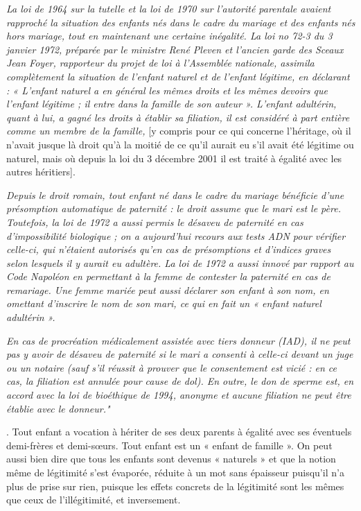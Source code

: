 {\emph{La loi de 1964 sur la tutelle et la loi de 1970 sur l'autorité parentale avaient rapproché la situation des enfants nés dans le cadre du mariage et des enfants nés hors mariage, tout en maintenant une certaine inégalité. La loi no 72-3 du 3 janvier 1972, préparée par le ministre René Pleven et l'ancien garde des Sceaux Jean Foyer, rapporteur du projet de loi à l'Assemblée nationale, assimila complètement la situation de l'enfant naturel et de l'enfant légitime, en déclarant : « L'enfant naturel a en général les mêmes droits et les mêmes devoirs que l'enfant légitime ; il entre dans la famille de son auteur ». L'enfant adultérin, quant à lui, a gagné les droits à établir sa filiation, il est considéré à part entière comme un membre de la famille,}  [y compris pour ce qui concerne l'héritage, où il n'avait  jusque là droit qu'à la moitié de ce qu'il aurait eu s'il avait été légitime ou naturel, mais où depuis la loi du 3 décembre 2001 il est traité à égalité avec les autres héritiers].

\emph{Depuis le droit romain, tout enfant né dans le cadre du mariage bénéficie d'une présomption automatique de paternité : le droit assume que le mari est le père. Toutefois, la loi de 1972 a aussi permis le désaveu de paternité en cas d'impossibilité biologique ; on a aujourd'hui recours aux tests ADN pour vérifier celle-ci, qui n'étaient autorisés qu'en cas de présomptions et d'indices graves selon lesquels il y aurait eu adultère. La loi de 1972 a aussi innové par rapport au Code Napoléon en permettant à la femme de contester la paternité en cas de remariage. Une femme mariée peut aussi déclarer son enfant à son nom, en omettant d'inscrire le nom de son mari, ce qui en fait un « enfant naturel adultérin ».}

\emph{En cas de procréation médicalement assistée avec tiers donneur (IAD), il ne peut pas y avoir de désaveu de paternité si le mari a consenti à celle-ci devant un juge ou un notaire (sauf s'il réussit à prouver que le consentement est vicié : en ce cas, la filiation est annulée pour cause de dol). En outre, le don de sperme est, en accord avec la loi de bioéthique de 1994, anonyme et aucune filiation ne peut être établie avec le donneur."}}. Tout enfant a vocation à hériter de ses deux parents à égalité avec ses éventuels demi-frères et demi-sœurs. Tout enfant est un « enfant de famille ». On peut aussi bien dire que tous les enfants sont devenus « naturels » et que la notion même de légitimité s'est évaporée, réduite à un mot sans épaisseur puisqu'il n'a plus de prise sur rien, puisque les effets concrets de la légitimité sont les mêmes que ceux de l'illégitimité, et inversement.
 
